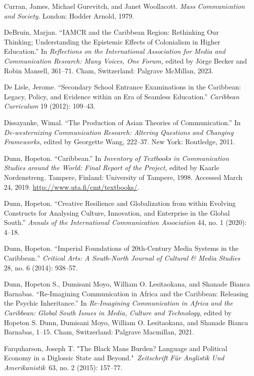 \documentclass{tufte-handout}
\begin{document}
\begin{hangparas}{.25in}{1}
Curran, James, Michael Gurevitch, and Janet Woollacott. \emph{Mass
Communication and Society.} London: Hodder Arnold, 1979.

DeBruin, Marjan. ``IAMCR and the Caribbean Region: Rethinking Our
Thinking; Understanding the Epistemic Effects of Colonialism in Higher
Education.'' In \emph{Reflections on the International Association for
Media and Communication Research: Many Voices, One Forum,} edited by
Jörge Becker and Robin Mansell, 361--71. Cham, Switzerland: Palgrave
McMillan, 2023.

De Lisle, Jerome. ``Secondary School Entrance Examinations in the
Caribbean: Legacy, Policy, and Evidence within an Era of Seamless
Education.'' \emph{Caribbean Curriculum} 19 (2012): 109--43.

Dissayanke, Wimal. ``The Production of Asian Theories of
Communication.'' In \emph{De-westernizing Communication Research:
Altering Questions and Changing Frameworks,} edited by Georgette Wang,
222--37. New York: Routledge, 2011.

Dunn, Hopeton. ``Caribbean.'' In \emph{Inventory of Textbooks in
Communication Studies around the World: Final Report of the Project,}
edited by Kaarle Nordenstreng. Tampere, Finland: University of Tampere,
1998. Accessed March 24, 2019. \url{http://www.uta.fi/cmt/textbooks/}.

Dunn, Hopeton. ``Creative Resilience and Globalization from within
Evolving Constructs for Analysing Culture, Innovation, and Enterprise in
the Global South.'' \emph{Annals of the International Communication
Association} 44, no. 1 (2020): 4--18.

Dunn, Hopeton. ``Imperial Foundations of 20th-Century Media Systems in
the Caribbean\emph{.}'' \emph{Critical Arts: A South-North Journal of Cultural \& Media Studies}
28, no. 6 (2014): 938--57.

Dunn, Hopeton S., Dumisani Moyo, William O. Lesitaokana, and Shanade
Bianca Barnabas. ``Re-Imagining Communication in Africa and the
Caribbean: Releasing the Psychic Inheritance.'' In \emph{Re-Imagining
Communication in Africa and the Caribbean: Global South Issues in Media,
Culture and Technology}, edited by Hopeton S. Dunn, Dumisani Moyo,
William O. Lesitaokana, and Shanade Bianca Barnabas, 1--15. Cham,
Switzerland: Palgrave Macmillan, 2021.

Farquharson, Joseph T. "The Black Man\textquotesingle s Burden? Language
and Political Economy in a Diglossic State and
Beyond."~\emph{Zeitschrift Für Anglistik Und Amerikanistik}~63, no. 2
(2015): 157--77.


\end{hangparas}
\end{document}
